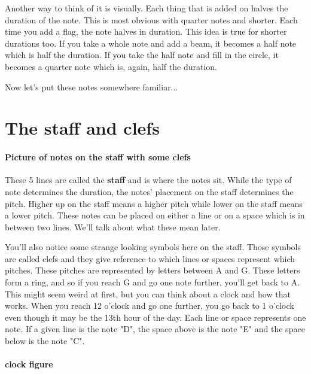 \documentclass[../OpenAppliedMusicTheory.tex]{subfiles}
\begin{document}
        Another way to think of it is visually. Each thing that is added on halves the duration of the note. This is most obvious with quarter notes and shorter. Each time you add a flag, the note halves in duration. This idea is true for shorter durations too. If you take a whole note and add a beam, it becomes a half note which is half the duration. If you take the half note and fill in the circle, it becomes a quarter note which is, again, half the duration.


        Now let's put these notes somewhere familiar...

    \section{The staff and clefs}\label{ch1.staff}
        \paragraph{Picture of notes on the staff with some clefs}
        
        These 5 lines are called the \textbf{staff} and is where the notes sit. While the type of note determines the duration, the notes' placement on the staff determines the pitch. Higher up on the staff means a higher pitch while lower on the staff means a lower pitch. These notes can be placed on either a line or on a space which is in between two lines. We'll talk about what these mean later.

        You'll also notice some strange looking symbols here on the staff. Those symbols are called clefs and they give reference to which lines or spaces represent which pitches. These pitches are represented by letters between A and G. These letters form a ring, and so if you reach G and go one note further, you'll get back to A. This might seem weird at first, but you can think about a clock and how that works. When you reach 12 o'clock and go one further, you go back to 1 o'clock even though it may be the 13th hour of the day. Each line or space represents one note. If a given line is the note "D", the space above is the note "E" and the space below is the note "C".

        \paragraph{clock figure}
\end{document}
